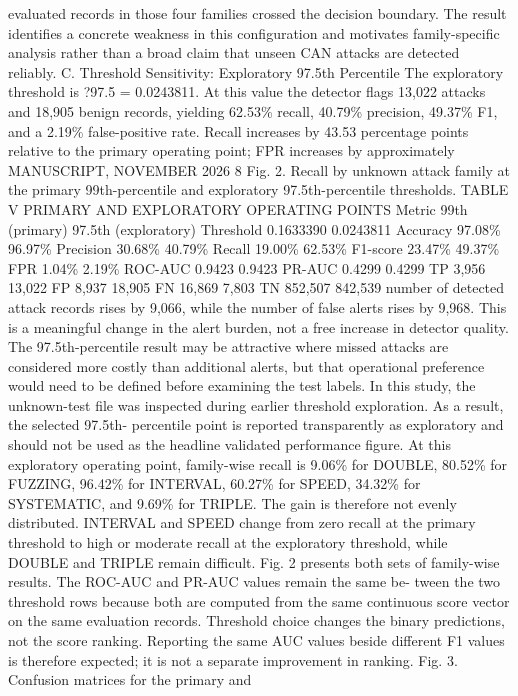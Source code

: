 \documentclass[
]{article}
\begin{document}
evaluated records in those four families crossed the decision boundary.
The result identifies a concrete weakness in this configuration and
motivates family-specific analysis rather than a broad claim that unseen
CAN attacks are detected reliably. C. Threshold Sensitivity: Exploratory
97.5th Percentile The exploratory threshold is ?97.5 = 0.0243811. At
this value the detector flags 13,022 attacks and 18,905 benign records,
yielding 62.53\% recall, 40.79\% precision, 49.37\% F1, and a 2.19\%
false-positive rate. Recall increases by 43.53 percentage points
relative to the primary operating point; FPR increases by approximately
MANUSCRIPT, NOVEMBER 2026 8 Fig. 2. Recall by unknown attack family at
the primary 99th-percentile and exploratory 97.5th-percentile
thresholds. TABLE V PRIMARY AND EXPLORATORY OPERATING POINTS Metric 99th
(primary) 97.5th (exploratory) Threshold 0.1633390 0.0243811 Accuracy
97.08\% 96.97\% Precision 30.68\% 40.79\% Recall 19.00\% 62.53\%
F1-score 23.47\% 49.37\% FPR 1.04\% 2.19\% ROC-AUC 0.9423 0.9423 PR-AUC
0.4299 0.4299 TP 3,956 13,022 FP 8,937 18,905 FN 16,869 7,803 TN 852,507
842,539 number of detected attack records rises by 9,066, while the
number of false alerts rises by 9,968. This is a meaningful change in
the alert burden, not a free increase in detector quality. The
97.5th-percentile result may be attractive where missed attacks are
considered more costly than additional alerts, but that operational
preference would need to be defined before examining the test labels. In
this study, the unknown-test file was inspected during earlier threshold
exploration. As a result, the selected 97.5th- percentile point is
reported transparently as exploratory and should not be used as the
headline validated performance figure. At this exploratory operating
point, family-wise recall is 9.06\% for DOUBLE, 80.52\% for FUZZING,
96.42\% for INTERVAL, 60.27\% for SPEED, 34.32\% for SYSTEMATIC, and
9.69\% for TRIPLE. The gain is therefore not evenly distributed.
INTERVAL and SPEED change from zero recall at the primary threshold to
high or moderate recall at the exploratory threshold, while DOUBLE and
TRIPLE remain difficult. Fig. 2 presents both sets of family-wise
results. The ROC-AUC and PR-AUC values remain the same be- tween the two
threshold rows because both are computed from the same continuous score
vector on the same evaluation records. Threshold choice changes the
binary predictions, not the score ranking. Reporting the same AUC values
beside different F1 values is therefore expected; it is not a separate
improvement in ranking. Fig. 3. Confusion matrices for the primary and
\end{document}
